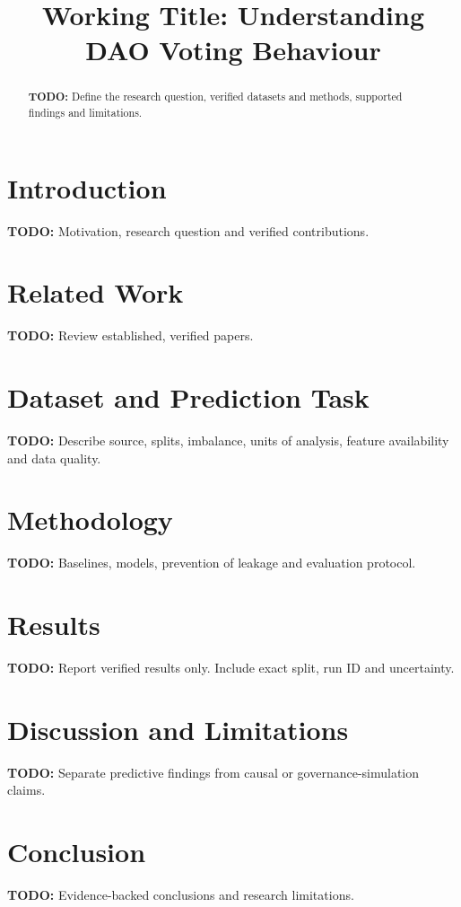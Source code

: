 \documentclass[runningheads]{llncs}
\begin{document}
\title{Working Title: Understanding DAO Voting Behaviour}
\author{}
\institute{}
\maketitle

\begin{abstract}
\textbf{TODO:} Define the research question, verified datasets and methods, supported findings and limitations.
\end{abstract}

\section{Introduction}
\textbf{TODO:} Motivation, research question and verified contributions.

\section{Related Work}
\textbf{TODO:} Review established, verified papers.

\section{Dataset and Prediction Task}
\textbf{TODO:} Describe source, splits, imbalance, units of analysis, feature availability and data quality.

\section{Methodology}
\textbf{TODO:} Baselines, models, prevention of leakage and evaluation protocol.

\section{Results}
\textbf{TODO:} Report verified results only. Include exact split, run ID and uncertainty.

\section{Discussion and Limitations}
\textbf{TODO:} Separate predictive findings from causal or governance-simulation claims.

\section{Conclusion}
\textbf{TODO:} Evidence-backed conclusions and research limitations.



\end{document}
